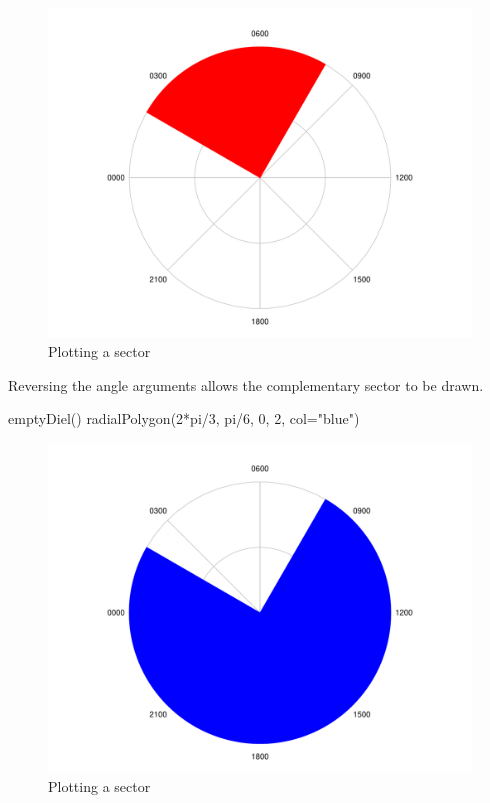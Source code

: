 \documentclass[
]{book}
\newenvironment{Shaded}{\begin{snugshade}}{\end{snugshade}}
\newcommand{\AttributeTok}[1]{\textcolor[rgb]{0.77,0.63,0.00}{#1}}
\newcommand{\DecValTok}[1]{\textcolor[rgb]{0.00,0.00,0.81}{#1}}
\newcommand{\FunctionTok}[1]{\textcolor[rgb]{0.00,0.00,0.00}{#1}}
\newcommand{\NormalTok}[1]{#1}
\newcommand{\SpecialCharTok}[1]{\textcolor[rgb]{0.00,0.00,0.00}{#1}}
\newcommand{\StringTok}[1]{\textcolor[rgb]{0.31,0.60,0.02}{#1}}
\begin{document}
\begin{figure}

{\centering \includegraphics[width=0.9\linewidth]{_main_files/figure-latex/radialPolygon-sector-1} 

}

\caption{Plotting a sector}\label{fig:radialPolygon-sector}
\end{figure}

Reversing the angle arguments allows the complementary sector to be drawn.

\begin{Shaded}
\begin{Highlighting}[]
\FunctionTok{emptyDiel}\NormalTok{()}
\FunctionTok{radialPolygon}\NormalTok{(}\DecValTok{2}\SpecialCharTok{*}\NormalTok{pi}\SpecialCharTok{/}\DecValTok{3}\NormalTok{, pi}\SpecialCharTok{/}\DecValTok{6}\NormalTok{, }\DecValTok{0}\NormalTok{, }\DecValTok{2}\NormalTok{, }\AttributeTok{col=}\StringTok{"blue"}\NormalTok{)}
\end{Highlighting}
\end{Shaded}

\begin{figure}

{\centering \includegraphics[width=0.9\linewidth]{_main_files/figure-latex/radialPolygon-sector2-1} 

}

\caption{Plotting a sector}\label{fig:radialPolygon-sector2}
\end{figure}
\end{document}
